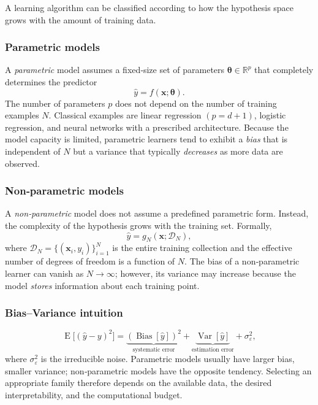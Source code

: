 \documentclass[12pt, a4paper]{article}
\providecommand{\operatorname}[1]{\mathop{\mathrm{#1}}\nolimits}
\begin{document}
A learning algorithm can be classified according to how the hypothesis space grows with the amount of training data.

\subsubsection{Parametric models}
A \emph{parametric} model assumes a fixed‑size set of parameters \(\boldsymbol{\theta}\in\mathbb{R}^{p}\) that completely determines the predictor 
\[
\hat{y}=f(\mathbf{x};\boldsymbol{\theta}) .
\]
The number of parameters \(p\) does not depend on the number of training examples \(N\).  Classical examples are linear regression \((p=d+1)\), logistic regression, and neural networks with a prescribed architecture.  
Because the model capacity is limited, parametric learners tend to exhibit a \emph{bias} that is independent of \(N\) but a variance that typically \emph{decreases} as more data are observed.

\subsubsection{Non‑parametric models}
A \emph{non‑parametric} model does not assume a predefined parametric form.  Instead, the complexity of the hypothesis grows with the training set.  Formally,
\[
\hat{y}=g_N(\mathbf{x};\mathcal{D}_N),
\]
where \(\mathcal{D}_N=\{(\mathbf{x}_i,y_i)\}_{i=1}^{N}\) is the entire training collection and the effective number of degrees of freedom is a function of \(N\).  
The bias of a non‑parametric learner can vanish as \(N\to\infty\); however, its variance may increase because the model \emph{stores} information about each training point.

\subsubsection{Bias–Variance intuition}
\[
\operatorname{E}\big[(\hat{y} - y)^2\big] 
      = \underbrace{(\operatorname{Bias}[\hat{y}])^{2}}_{\text{systematic error}}
      + \underbrace{\operatorname{Var}[\hat{y}]}_{\text{estimation error}}
      + \sigma^{2}_{\varepsilon},
\]
where \(\sigma^{2}_{\varepsilon}\) is the irreducible noise.  Parametric models usually have larger bias, smaller variance; non‑parametric models have the opposite tendency.  Selecting an appropriate family therefore depends on the available data, the desired interpretability, and the computational budget.

\vspace{0.5cm}
\end{document}
